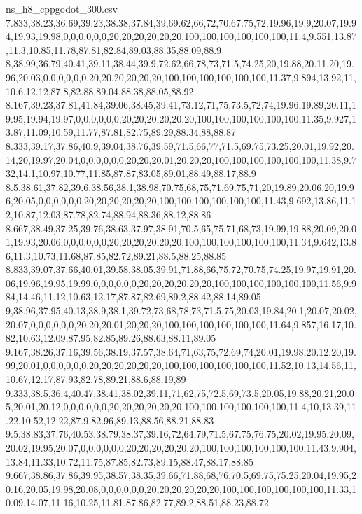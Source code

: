 \begin{filecontents*}[overwrite]{ns_h8_cppgodot_300.csv}
7.833,38.23,36.69,39.23,38.38,37.84,39,69.62,66,72,70,67.75,72,19.96,19.9,20.07,19.94,19.93,19.98,0,0,0,0,0,0,20,20,20,20,20,20,100,100,100,100,100,100,11.4,9.551,13.87,11.3,10.85,11.78,87.81,82.84,89.03,88.35,88.09,88.9
8,38.99,36.79,40.41,39.11,38.44,39.9,72.62,66,78,73,71.5,74.25,20,19.88,20.11,20,19.96,20.03,0,0,0,0,0,0,20,20,20,20,20,20,100,100,100,100,100,100,11.37,9.894,13.92,11,10.6,12.12,87.8,82.88,89.04,88.38,88.05,88.92
8.167,39.23,37.81,41.84,39.06,38.45,39.41,73.12,71,75,73.5,72,74,19.96,19.89,20.11,19.95,19.94,19.97,0,0,0,0,0,0,20,20,20,20,20,20,100,100,100,100,100,100,11.35,9.927,13.87,11.09,10.59,11.77,87.81,82.75,89.29,88.34,88,88.87
8.333,39.17,37.86,40.9,39.04,38.76,39.59,71.5,66,77,71.5,69.75,73.25,20.01,19.92,20.14,20,19.97,20.04,0,0,0,0,0,0,20,20,20.01,20,20,20,100,100,100,100,100,100,11.38,9.732,14.1,10.97,10.77,11.85,87.87,83.05,89.01,88.49,88.17,88.9
8.5,38.61,37.82,39.6,38.56,38.1,38.98,70.75,68,75,71,69.75,71,20,19.89,20.06,20,19.96,20.05,0,0,0,0,0,0,20,20,20,20,20,20,100,100,100,100,100,100,11.43,9.692,13.86,11.12,10.87,12.03,87.78,82.74,88.94,88.36,88.12,88.86
8.667,38.49,37.25,39.76,38.63,37.97,38.91,70.5,65,75,71,68,73,19.99,19.88,20.09,20.01,19.93,20.06,0,0,0,0,0,0,20,20,20,20,20,20,100,100,100,100,100,100,11.34,9.642,13.86,11.3,10.73,11.68,87.85,82.72,89.21,88.5,88.25,88.85
8.833,39.07,37.66,40.01,39.58,38.05,39.91,71.88,66,75,72,70.75,74.25,19.97,19.91,20.06,19.96,19.95,19.99,0,0,0,0,0,0,20,20,20,20,20,20,100,100,100,100,100,100,11.56,9.984,14.46,11.12,10.63,12.17,87.87,82.69,89.2,88.42,88.14,89.05
9,38.96,37.95,40.13,38.9,38.1,39.72,73,68,78,73,71.5,75,20.03,19.84,20.1,20.07,20.02,20.07,0,0,0,0,0,0,20,20,20.01,20,20,20,100,100,100,100,100,100,11.64,9.857,16.17,10.82,10.63,12.09,87.95,82.85,89.26,88.63,88.11,89.05
9.167,38.26,37.16,39.56,38.19,37.57,38.64,71,63,75,72,69,74,20.01,19.98,20.12,20,19.99,20.01,0,0,0,0,0,0,20,20,20,20,20,20,100,100,100,100,100,100,11.52,10.13,14.56,11,10.67,12.17,87.93,82.78,89.21,88.6,88.19,89
9.333,38.5,36.4,40.47,38.41,38.02,39.11,71,62,75,72.5,69,73.5,20.05,19.88,20.21,20.05,20.01,20.12,0,0,0,0,0,0,20,20,20,20,20,20,100,100,100,100,100,100,11.4,10,13.39,11.22,10.52,12.22,87.9,82.96,89.13,88.56,88.21,88.83
9.5,38.83,37.76,40.53,38.79,38.37,39.16,72,64,79,71.5,67.75,76.75,20.02,19.95,20.09,20.02,19.95,20.07,0,0,0,0,0,0,20,20,20,20,20,20,100,100,100,100,100,100,11.43,9.904,13.84,11.33,10.72,11.75,87.85,82.73,89.15,88.47,88.17,88.85
9.667,38.86,37.86,39.95,38.57,38.35,39.66,71.88,68,76,70.5,69.75,75.25,20.04,19.95,20.16,20.05,19.98,20.08,0,0,0,0,0,0,20,20,20,20,20,20,100,100,100,100,100,100,11.33,10.09,14.07,11.16,10.25,11.81,87.86,82.77,89.2,88.51,88.23,88.72

\end{filecontents*}
